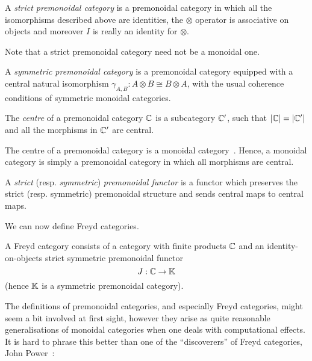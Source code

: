 A \emph{strict premonoidal category} is a premonoidal category in which all the
isomorphisms described above are identities, the $\otimes$ operator is
associative on objects and moreover $I$ is really an identity for $\otimes$.

Note that a strict premonoidal category need not be a monoidal one.

A \emph{symmetric premonoidal category} is a premonoidal category equipped with
a central natural isomorphism $\gamma_{A,B} : A\otimes B \cong B\otimes A$, with
the usual coherence conditions of symmetric monoidal categories.

The \emph{centre} of a premonoidal category $\mathbb{C}$ is a subcategory $\mathbb{C}'$,
such that $|\mathbb{C}| = |\mathbb{C}'|$ and all the morphisms in $\mathbb{C}'$ are central.

The centre of a premonoidal category is a monoidal
category~\cite[Prop.~3.1]{pow-rob}.
Hence, a monoidal category is simply a premonoidal category in which all
morphisms are central.

A \emph{strict} (resp. \emph{symmetric}) \emph{premonoidal functor} is a functor which
preserves the strict (resp. symmetric) premonoidal structure and sends central
maps to central maps.

We can now define Freyd categories.

\begin{definition}
    A Freyd category consists of a category with finite products $\mathbb{C}$
    and an identity-on-objects strict symmetric premonoidal functor
    \[ J: \mathbb{C} \to \mathbb{K} \]
    (hence $\mathbb{K}$ is a symmetric premonoidal category).
\end{definition}

The definitions of premonoidal categories, and especially Freyd categories,
might seem a bit involved at first sight, however they arise as quite
reasonable generalisations of monoidal categories when one deals with
computational effects. It is hard to phrase this better than one of the
``discoverers'' of Freyd categories, John Power~\cite{gen-comp-eff-models}:

